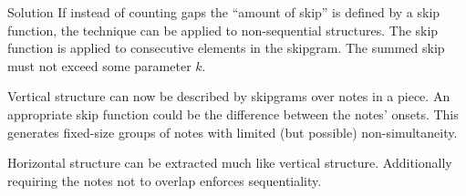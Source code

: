 \documentclass[final,cmyk]{beamer}
\newcommand*{\pianoroll}{
  \draw (0,2) rectangle (1,2.4);
  \draw (1,2.4) rectangle (2,2.8);
  \draw (2,2) rectangle (2.5,2.4);
  \draw (2.5,1.6) rectangle (3,2);
  \draw (3,1.2) rectangle (3.5,1.6);
  \draw (3.5,0.8) rectangle (4,1.2);
  
  \draw (4,1.6) rectangle (5,2);
  \draw (5,2) rectangle (6,2.4);
  \draw (6,1.6) rectangle (6.5,2);
  \draw (6.5,1.2) rectangle (7,1.6);
  \draw (7,0.8) rectangle (7.5,1.2);
  \draw (7.5,0.4) rectangle (8,0.8);
  
  \draw (1,-0.4) rectangle (2,0);
  \draw (2,0) rectangle (4,0.4);
  \draw (5,-0.8) rectangle (6,-0.4);
  \draw (6,-0.4) rectangle (8,0);
}
\begin{document}
\begin{frame}[t]
\begin{columns}[t]
\begin{column}{0.3\textwidth}
\begin{block}{Solution}
        If instead of counting gaps the \enquote{amount of skip} is defined by a
        \alert{skip function}, the technique can be applied to non-sequential structures.
        The skip function is applied to consecutive elements in the skipgram.
        The summed skip must not exceed some parameter $k$.

        \begin{adjustbox}{scale=2.7,center,margin=0 0 0 1ex}
        \end{adjustbox}
        \begin{adjustbox}{scale=1.45,margin=0 0 0 1ex}
        \end{adjustbox}
        
        Vertical structure can now be described by \alert{skipgrams over notes} in a piece.
        An appropriate skip function could be the difference between the notes' onsets.
        This generates fixed-size groups of notes with \alert{limited} (but possible)
        \alert{non-simultaneity}.

        \begin{adjustbox}{scale=2.7,center,margin=0 1ex}
        \end{adjustbox}
        
        Horizontal structure can be extracted much like vertical structure.
        Additionally requiring the notes not to overlap enforces \alert{sequentiality}.


\end{block}
\end{column}
\end{columns}
\end{frame}
\end{document}
